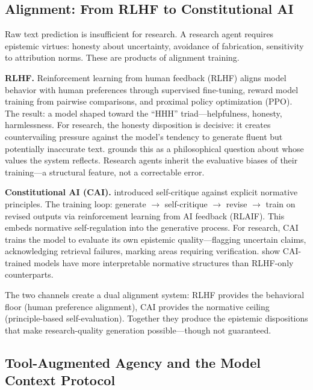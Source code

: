 \documentclass{article}
\begin{document}

\subsection{Alignment: From RLHF to Constitutional AI}

Raw text prediction is insufficient for research. A research agent requires epistemic virtues: honesty about uncertainty, avoidance of fabrication, sensitivity to attribution norms. These are products of alignment training.

\textbf{RLHF.} Reinforcement learning from human feedback (RLHF) \citep{ouyang2022rlhf} aligns model behavior with human preferences through supervised fine-tuning, reward model training from pairwise comparisons, and proximal policy optimization (PPO). The result: a model shaped toward the ``HHH'' triad---helpfulness, honesty, harmlessness. For research, the honesty disposition is decisive: it creates countervailing pressure against the model's tendency to generate fluent but potentially inaccurate text. \citet{gabriel2020ai} grounds this as a philosophical question about whose values the system reflects. Research agents inherit the evaluative biases of their training---a structural feature, not a correctable error.

\textbf{Constitutional AI (CAI).} \citet{bai2022constitutional} introduced self-critique against explicit normative principles. The training loop: generate $\rightarrow$ self-critique $\rightarrow$ revise $\rightarrow$ train on revised outputs via reinforcement learning from AI feedback (RLAIF). This embeds normative self-regulation into the generative process. For research, CAI trains the model to evaluate its own epistemic quality---flagging uncertain claims, acknowledging retrieval failures, marking areas requiring verification. \citet{henneking2025inverse} show CAI-trained models have more interpretable normative structures than RLHF-only counterparts.

The two channels create a dual alignment system: RLHF provides the behavioral floor (human preference alignment), CAI provides the normative ceiling (principle-based self-evaluation). Together they produce the epistemic dispositions that make research-quality generation possible---though not guaranteed.

\subsection{Tool-Augmented Agency and the Model Context Protocol}
\end{document}
